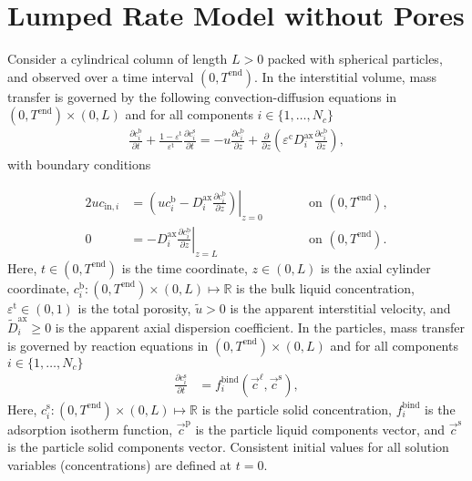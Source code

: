 \documentclass{article}
\begin{document}
\section*{Lumped Rate Model without Pores}
Consider a cylindrical column of length $L > 0$ packed with spherical particles, and observed over a time interval $(0, T^{\mathrm{end}})$.
In the interstitial volume, mass transfer is governed by the following convection-diffusion equations in $(0, T^\mathrm{end})\times (0, L)$ and for all components $i\in\{1, \dots, N_c\}$
\begin{align}
\frac{\partial c^{\mathrm{b}}_i}{\partial t} + \frac{1 - \varepsilon^{\mathrm{t}}}{\varepsilon^{\mathrm{t}}} \frac{\partial c^{\mathrm{s}}_i}{\partial t} = - u \frac{\partial c^{\mathrm{b}}_i }{\partial z} + \frac{\partial}{\partial z} \left( \varepsilon^{\mathrm{c}} D^{\mathrm{ax}}_{i} \frac{\partial c^{\mathrm{b}}_i}{\partial z} \right),
\end{align}
with boundary conditions

\begin{alignat}{2}
u c_{\mathrm{in},i} &= \left.\left( u c^{\mathrm{b}}_i - D^{\mathrm{ax}}_{i} \frac{\partial c^{\mathrm{b}}_i}{\partial z}\right)\right|_{z=0} & &\qquad\text{on }(0, T^{\mathrm{end}}),\\
               0 &= - D^{\mathrm{ax}}_{i} \left. \frac{\partial c^{\mathrm{b}}_i}{\partial z} \right|_{z=L} & &\qquad\text{on }(0, T^{\mathrm{end}}).
\end{alignat}
Here, $t\in (0, T^{\mathrm{end}})$ is the time coordinate, $z\in (0, L)$ is the axial cylinder coordinate, $c^\mathrm{b}_i\colon (0, T^\mathrm{end})\times (0, L) \mapsto \mathbb{R}$ is the bulk liquid concentration, $\varepsilon^{\mathrm{t}}\in (0, 1)$ is the total porosity, $\tilde{u}> 0$ is the apparent interstitial velocity, and $\tilde{D}^\mathrm{ax}_i\geq 0$ is the apparent axial dispersion coefficient.
In the particles, mass transfer is governed by reaction equations in $ (0, T^\mathrm{end}) \times (0, L)$ and for all components $i\in\{1, \dots, N_c\}$
\begin{align}
          \frac{\partial c^{\mathrm{s}}_{i}}{\partial t}
          &= f^{\mathrm{bind}}_{i}\left( \vec{c}^{\mathrm{\ell}}, \vec{c}^{\mathrm{s}} \right), \end{align}
Here, $c^\mathrm{s}_i\colon  (0, T^\mathrm{end}) \times (0, L) \mapsto \mathbb{R}$ is the particle solid concentration, $f^\mathrm{bind}_i$ is the adsorption isotherm function, $\vec{c}^\mathrm{p}$ is the particle liquid components vector, and $\vec{c}^\mathrm{s}$ is the particle solid components vector.
Consistent initial values for all solution variables (concentrations) are defined at $t = 0$.
\end{document}
